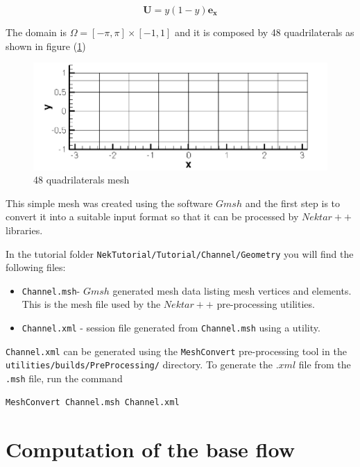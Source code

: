 \documentclass[a4paper,12pt]{article}
\begin{document}
\begin{equation}
\mathbf{U}=y(1-y)\mathbf{e_x}
\end{equation}

The domain is $\Omega=[-\pi,\pi] \times [-1,1]$ and it is composed by 48 quadrilaterals as shown in figure (\ref{Channel_mesh})

\begin{figure}
\centering
\includegraphics[scale=1]{mesh_chan.png}
\caption{48 quadrilaterals mesh}
\label{Channel_mesh}
\end{figure}

This simple mesh was created using the software $Gmsh$ and the first step is to convert it into a suitable input format so that it can be processed by $Nektar++$ libraries.

\vspace{1cm}
In the tutorial folder \texttt{NekTutorial/Tutorial/Channel/Geometry} you will find the following files: 
\begin{itemize}
\item \texttt{Channel.msh}- $Gmsh$ generated mesh data listing mesh vertices and elements. This is the mesh file used by the $Nektar++$ pre-processing utilities.
\item \texttt{Channel.xml} - \nektar session file generated from
\texttt{Channel.msh} using a \nektar utility. \end{itemize}

\texttt{Channel.xml} can be generated using the \texttt{MeshConvert} pre-processing tool in the \\
\texttt{utilities/builds/PreProcessing/} directory. To generate the $.xml$ file
from the \texttt{.msh} file, run the command

\begin{verbatim}
MeshConvert Channel.msh Channel.xml
\end{verbatim}

\section{Computation of the base flow}
\end{document}

